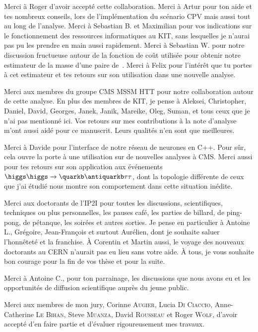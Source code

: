 Merci à Roger d'avoir accepté cette collaboration.
Merci à Artur pour ton aide et tes nombreux conseils, lors de l'implémentation du scénario CPV mais aussi tout au long de l'analyse.
Merci à Sebastian B. et Maximilian pour vos indications sur le fonctionnement des ressources informatiques au KIT,
sans lesquelles je n'aurai pas pu les prendre en main aussi rapidement.
Merci à Sebastian W. pour notre discussion fructueuse autour de la fonction de coût utilisée pour obtenir notre estimateur de la masse d'une paire de~\tau.
Merci à Felix pour l'intérêt que tu portes à cet estimateur et tes retours sur son utilisation dans une nouvelle analyse.
\par
Merci aux membres du groupe CMS MSSM HTT pour notre collaboration autour de cette analyse.
En plus des membres de KIT,
je pense à
Aleksei,
Christopher,
Daniel,
David,
Georges,
Janek,
Janik,
Mareike,
Oleg,
Suman,
et tous ceux que je n'ai pas mentionné ici.
Vos retours sur mes contributions à la note d'analyse m'ont aussi aidé pour ce manuscrit.
Leurs qualités n'en sont que meilleures.
\par
Merci à Davide pour l'interface de notre réseau de neurones en C++.
Pour sûr, cela ouvre la porte à une utilisation sur de nouvelles analyses à CMS.
Merci aussi pour tes retours sur son application aux événements $\higgs\higgs\to\quarkb\antiquarkb\tau\tau$,
dont la topologie différente de ceux que j'ai étudié nous montre son comportement dans cette situation inédite.
\par
Merci aux doctorants de l'IP2I pour
toutes les discussions, scientifiques, techniques ou plus personnelles,
les pauses café,
les parties de billard, de ping-pong, de pétanque,
les soirées et autres sorties.
Je pense en particulier à
Antoine L., Grégoire, Jean-François
et surtout Aurélien,
dont je souhaite saluer l'honnêteté et la franchise.
À Corentin et Martin aussi,
le voyage des nouveaux doctorants au CERN n'aurait pas eu lieu sans votre aide.
À tous, je vous souhaite bon courage pour la fin de vos thèse et pour la suite.
\par
Merci à Antoine C., pour ton parrainage, les discussions que nous avons eu
et les opportunités de diffusion scientifique auprès du jeune public.
\par
Merci aux membres de mon jury,
Corinne \textsc{Augier},
Lucia \textsc{Di Ciaccio},
Anne-Catherine \textsc{Le Bihan},
Steve \textsc{Muanza},
David \textsc{Rousseau} et
Roger \textsc{Wolf},
d'avoir accepté d'en faire partie et d'évaluer rigoureusement mes travaux.
